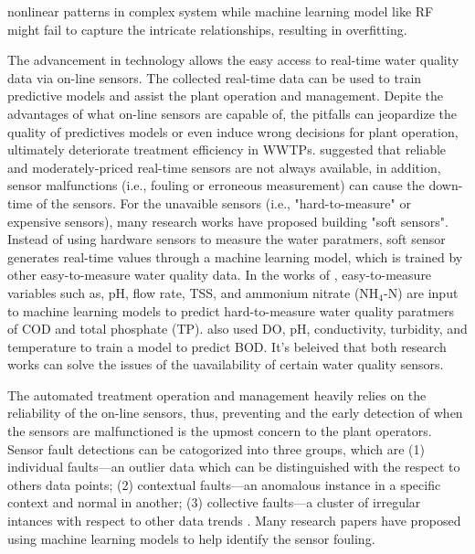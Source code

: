 nonlinear patterns in complex system while machine learning model like RF might fail to capture the intricate relationships, resulting in overfitting.

The advancement in technology allows the easy access to real-time water quality data via on-line sensors. The collected real-time data can be used to train predictive models and assist the plant operation and management. Depite the advantages of what on-line sensors are capable of, the pitfalls can jeopardize the quality of predictives models or even induce wrong decisions for plant operation, ultimately deteriorate treatment efficiency in WWTPs. \citet{haimiShallWeUse2015} suggested that reliable and moderately-priced real-time sensors are not always available, in addition, sensor malfunctions (i.e., fouling or erroneous measurement) can cause the down-time of the sensors. For the unavaible sensors (i.e., "hard-to-measure" or expensive sensors), many research works have proposed building "soft sensors". Instead of using hardware sensors to measure the water paratmers, soft sensor generates real-time values through a machine learning model, which is trained by other easy-to-measure water quality data. In the works of \citet{wangExplicitInterpretableNonlinear2019}, easy-to-measure variables such as, pH, flow rate, TSS, and ammonium nitrate (NH$_4$-N) are input to machine learning models to predict hard-to-measure water quality paratmers of COD and total phosphate (TP). \citet{pattnaikMachineLearningBased2021} also used DO, pH, conductivity, turbidity, and temperature to train a model to predict BOD. It's beleived that both research works can solve the issues of the uavailability of certain water quality sensors. 

The automated treatment operation and management heavily relies on the reliability of the on-line sensors, thus, preventing and the early detection of when the sensors are malfunctioned is the upmost concern to the plant operators. Sensor fault detections can be catogorized into three groups, which are (1) individual faults---an outlier data which can be distinguished with the respect to others data points; (2) contextual faults---an anomalous instance in a specific context and normal in another; (3) collective faults---a cluster of irregular intances with respect to other data trends \citep{chandolaAnomalyDetectionSurvey}. Many research papers have proposed using machine learning models to help identify the sensor fouling.

